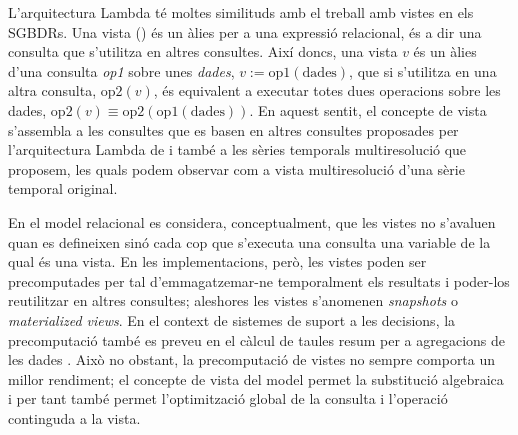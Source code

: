 L'arquitectura Lambda té moltes similituds amb el treball amb vistes
en els \glspl{SGBDR}.  Una vista () és un
àlies per a una expressió relacional, és a dir una consulta que
s'utilitza en altres consultes. Així doncs, una vista $v$ és un àlies
d'una consulta \emph{op1} sobre unes \emph{dades},
$v:=\text{op1}(\text{dades})$, que si s'utilitza en una altra
consulta, $\text{op2}(v)$, és equivalent a executar totes dues
operacions sobre les dades, $\text{op2}(v) \equiv
\text{op2}(\text{op1}(\text{dades}))$. En aquest sentit, el concepte
de vista s'assembla a les consultes que es basen en altres consultes
proposades per l'arquitectura Lambda de \citeauthor{marz14:bigdata} i
també a les sèries temporals multiresolució que proposem, les quals
podem observar com a vista multiresolució d'una sèrie temporal
original.

En el model relacional \cite[cap.~10.\ Views]{date04:introduction8} es
considera, conceptualment, que les vistes no s'avaluen quan es
defineixen sinó cada cop que s'executa una consulta una variable de la
qual és una vista.  En les implementacions, però, les vistes poden ser
precomputades per tal d'emmagatzemar-ne temporalment els resultats i
poder-los reutilitzar en altres consultes; aleshores les vistes
s'anomenen \emph{snapshots} o \emph{materialized views}. En el context
de sistemes de suport a les decisions, la precomputació també es
preveu en el càlcul de taules resum per a agregacions de les dades
\cite[cap.~22.\ Decision support]{date04:introduction8}.  Això no
obstant, la precomputació de vistes no sempre comporta un millor
rendiment; el concepte de vista del model permet la substitució
algebraica i per tant també permet l'optimització global de la consulta i
l'operació continguda a la vista.






